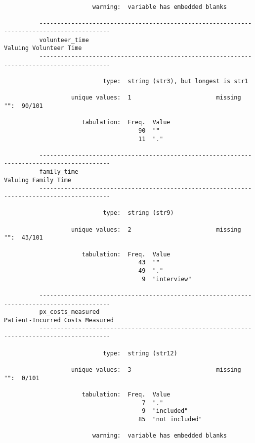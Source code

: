 \documentclass{article}
\begin{document}
\begin{verbatim}
                         warning:  variable has embedded blanks
          
          ------------------------------------------------------------------------------------------
          volunteer_time                                                      Valuing Volunteer Time
          ------------------------------------------------------------------------------------------
          
                            type:  string (str3), but longest is str1
          
                   unique values:  1                        missing "":  90/101
          
                      tabulation:  Freq.  Value
                                      90  ""
                                      11  "."
          
          ------------------------------------------------------------------------------------------
          family_time                                                            Valuing Family Time
          ------------------------------------------------------------------------------------------
          
                            type:  string (str9)
          
                   unique values:  2                        missing "":  43/101
          
                      tabulation:  Freq.  Value
                                      43  ""
                                      49  "."
                                       9  "interview"
          
          ------------------------------------------------------------------------------------------
          px_costs_measured                                          Patient-Incurred Costs Measured
          ------------------------------------------------------------------------------------------
          
                            type:  string (str12)
          
                   unique values:  3                        missing "":  0/101
          
                      tabulation:  Freq.  Value
                                       7  "."
                                       9  "included"
                                      85  "not included"
          
                         warning:  variable has embedded blanks
          

\end{verbatim}
\end{document}

